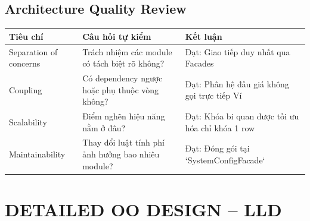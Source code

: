 \documentclass[11pt,a4paper]{article}
\begin{document}
\subsection{Architecture Quality Review}
\begin{table}[H]
    \centering
    \small
    \begin{tabularx}{\textwidth}{|l|X|l|}
        \hline
        \textbf{Tiêu chí} & \textbf{Câu hỏi tự kiểm} & \textbf{Kết luận} \\ \hline
        Separation of concerns & Trách nhiệm các module có tách biệt rõ không? & Đạt: Giao tiếp duy nhất qua Facades \\ \hline
        Coupling & Có dependency ngược hoặc phụ thuộc vòng không? & Đạt: Phân hệ đấu giá không gọi trực tiếp Ví \\ \hline
        Scalability & Điểm nghẽn hiệu năng nằm ở đâu? & Đạt: Khóa bi quan được tối ưu hóa chỉ khóa 1 row \\ \hline
        Maintainability & Thay đổi luật tính phí ảnh hưởng bao nhiêu module? & Đạt: Đóng gói tại `SystemConfigFacade` \\ \hline
    \end{tabularx}
\end{table}

\section{DETAILED OO DESIGN -- LLD}
\end{document}
